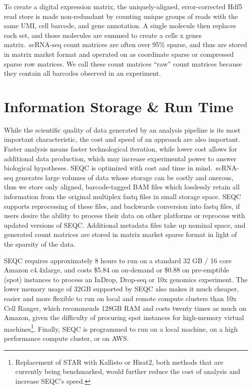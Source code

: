 To create a digital expression matrix, the uniquely-aligned, error-corrected Hdf5 read store is made non-redundant by counting unique groups of reads with the same UMI, cell barcode, and gene annotation. 
A single molecule then replaces each set, and those molecules are summed to create a cells x genes matrix.\ 
scRNA-seq count matrices are often over 95\% sparse, and thus are stored in matrix market format and operated on as coordinate sparse or compressed sparse row matrices. 
We call these count matrices ``raw'' count matrices because they contain all barcodes observed in an experiment.

\section{Information Storage \& Run Time}

While the scientific quality of data generated by an analysis pipeline is its most important characteristic, the cost and speed of an approach are also important. 
Faster analysis means faster technological iteration, while lower cost allows for additional data production, which may increase experimental power to answer biological hypotheses. 
SEQC is optimized with cost and time in mind.\ 
scRNA-seq generates large volumes of data whose storage can be costly and onerous, thus we store only aligned, barcode-tagged BAM files which losslessly retain all information from the original multiplex fastq files in small storage space. 
SEQC supports reprocessing of these files, and backwards conversion into fastq files, if users desire the ability to process their data on other platforms or reprocess with updated versions of SEQC\@. 
Additional metadata files take up nominal space, and generated count matrices are stored in matrix market sparse format in light of the sparsity of the data. 

SEQC requires approximately 8 hours to run on a standard 32 GB / 16 core Amazon c4.4xlarge, and costs \$5.84 on on-demand or \$0.88 on pre-emptible (spot) instances to process an InDrop, Drop-seq or 10x genomics experiment.
The lower memory usage of 32GB supported by SEQC also makes it much cheaper, easier and more flexible to run on local and remote compute clusters than 10x Cell Ranger, which recommends 128GB RAM and costs twenty times as much on Amazon, given the difficulty of procuring spot instances for high-memory virtual machines\footnote{Replacement of STAR with Kallisto or Hisat2, both methods that are currently being benchmarked, would further reduce the cost of analysis and increase SEQC's speed.}. 
Finally, SEQC is programmed to run on a local machine, on a high performance compute cluster, or on AWS. 

